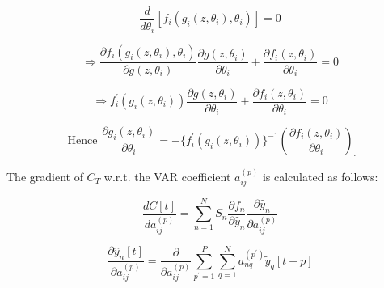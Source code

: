 \begin{equation} \label{dfwrttheta1}
\frac{d}{d \theta_{i}}\left[f_i\left(g_i\left(z, \theta_{i}\right), \theta_{i}\right)\right]=0
\end{equation}

\begin{equation} \label{dfwrttheta2}
\Rightarrow \frac{\partial f_i\left(g_i\left(z, \theta_{i}\right), \theta_{i}\right)}{\partial g\left(z, \theta_{i}\right)} \frac{\partial g\left(z, \theta_{i}\right)}{\partial \theta_{i}}+\frac{\partial f_i\left(z, \theta_{i}\right)}{\partial \theta_{i}}=0
\end{equation}

\begin{equation} \label{dfwrttheta3}
\Rightarrow {f^{\prime}_i(g_i(z,\theta_{i}))} \frac{\partial g\left(z, \theta_{i}\right)}{\partial \theta_{i}}+\frac{\partial f_i\left(z, \theta_{i}\right)}{\partial \theta_{i}}=0
\end{equation}


\begin{equation} \label{dgwrttheta1}
\text { Hence } \frac{\partial g_i\left(z, \theta_{i}\right)}{\partial \theta_{i}}=
-\big\{f^{\prime}_i(g_i(z,\theta_{i}))\big\}^{-1}{\left(\frac{\partial f_i\left(z, \theta_{i}\right)}{\partial \theta_{i}}\right)}_\cdot 
\end{equation}
%
%

The gradient of $C_T$ w.r.t. the VAR coefficient $a^{(p)}_{ij}$ is calculated as follows: 

\begin{equation} \label{dCwrtthetaa}
\frac{d C[t]}{d a^{(p)}_{i j}}=\sum_{n=1}^{N} S_{n}  \frac{\partial f_{n}}{\partial \hat y_{n}}  \frac{\partial \hat{y}_{n}}{\partial a_{i j}^{(p)}}
\end{equation}

\begin{equation} \label{dCwrtthetaa1} \nonumber
\frac{\partial \hat{y}_{n}[t]}{\partial a_{i j}^{(p)}}=\frac{\partial}{\partial a_{i j}^{(p)}} \sum_{p^\prime=1}^{P} \sum_{q=1}^{N} a_{n q}^{(p^\prime)} \tilde{y}_{q}[t-p]
\end{equation}

